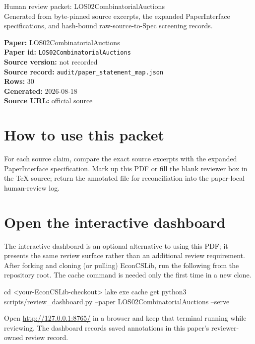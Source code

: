 \documentclass[10pt]{article}
\begin{document}
\fontsize{9}{10}\selectfont

\begin{center}
{\LARGE Human review packet: LOS02CombinatorialAuctions}\\[0.35em]
\small Generated from byte-pinned source excerpts, the expanded PaperInterface
specifications, and hash-bound raw-source-to-Spec screening records.
\end{center}

\noindent\textbf{Paper:} LOS02CombinatorialAuctions\\
\textbf{Paper id:} \texttt{LOS02CombinatorialAuctions}\\
\textbf{Source version:} not recorded\\
\textbf{Source record:} \texttt{audit/paper\_statement\_map.json}\\
\textbf{Rows:} 30\\
\textbf{Generated:} 2026-08-18\\
\textbf{Source URL:} \href{https://arxiv.org/pdf/cs/0202017v1}{official source}

\noindent{}\par



\section*{How to use this packet}
For each source claim, compare the exact source excerpts with the expanded
PaperInterface specification. Mark up this PDF or fill the blank reviewer box in the TeX source;
return the annotated file for reconciliation into the paper-local human-review
log.

\section*{Open the interactive dashboard}
The interactive dashboard is an optional alternative to using this PDF; it
presents the same review surface rather than an additional review requirement.
After forking and cloning (or pulling) EconCSLib, run the following from the
repository root. The cache command is needed only the first time in a new clone.
\begin{ReviewVerbatim}
cd <your-EconCSLib-checkout>
lake exe cache get
python3 scripts/review_dashboard.py --paper LOS02CombinatorialAuctions --serve
\end{ReviewVerbatim}
Open \url{http://127.0.0.1:8765/} in a browser and keep that terminal running
while reviewing. The dashboard records saved annotations in this paper's
reviewer-owned review record.
\end{document}
